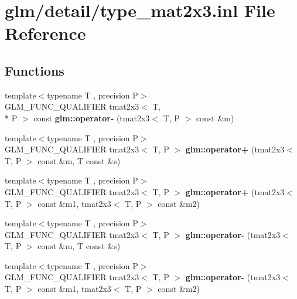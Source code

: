 \hypertarget{type__mat2x3_8inl}{\section{glm/detail/type\-\_\-mat2x3.inl File Reference}
\label{type__mat2x3_8inl}
}
\subsection*{Functions}
\begin{DoxyCompactItemize}
\item 
\hypertarget{namespaceglm_a3c270672db2f9fe9af471b877bff0453}{{\footnotesize template$<$typename T , precision P$>$ }\\G\-L\-M\-\_\-\-F\-U\-N\-C\-\_\-\-Q\-U\-A\-L\-I\-F\-I\-E\-R tmat2x3$<$ T, \\*
P $>$ const {\bfseries glm\-::operator-\/} (tmat2x3$<$ T, P $>$ const \&m)}\label{namespaceglm_a3c270672db2f9fe9af471b877bff0453}

\item 
\hypertarget{namespaceglm_a1c2757b8d487ce43f1e968d2258a9ea2}{{\footnotesize template$<$typename T , precision P$>$ }\\G\-L\-M\-\_\-\-F\-U\-N\-C\-\_\-\-Q\-U\-A\-L\-I\-F\-I\-E\-R tmat2x3$<$ T, P $>$ {\bfseries glm\-::operator+} (tmat2x3$<$ T, P $>$ const \&m, T const \&s)}\label{namespaceglm_a1c2757b8d487ce43f1e968d2258a9ea2}

\item 
\hypertarget{namespaceglm_a7578fa8147ab1357184c6043278f38e5}{{\footnotesize template$<$typename T , precision P$>$ }\\G\-L\-M\-\_\-\-F\-U\-N\-C\-\_\-\-Q\-U\-A\-L\-I\-F\-I\-E\-R tmat2x3$<$ T, P $>$ {\bfseries glm\-::operator+} (tmat2x3$<$ T, P $>$ const \&m1, tmat2x3$<$ T, P $>$ const \&m2)}\label{namespaceglm_a7578fa8147ab1357184c6043278f38e5}

\item 
\hypertarget{namespaceglm_aceff894a5f891e315294d68c9bb6f569}{{\footnotesize template$<$typename T , precision P$>$ }\\G\-L\-M\-\_\-\-F\-U\-N\-C\-\_\-\-Q\-U\-A\-L\-I\-F\-I\-E\-R tmat2x3$<$ T, P $>$ {\bfseries glm\-::operator-\/} (tmat2x3$<$ T, P $>$ const \&m, T const \&s)}\label{namespaceglm_aceff894a5f891e315294d68c9bb6f569}

\item 
\hypertarget{namespaceglm_a2a06e2f9118332e9be75b7d6e9b7810f}{{\footnotesize template$<$typename T , precision P$>$ }\\G\-L\-M\-\_\-\-F\-U\-N\-C\-\_\-\-Q\-U\-A\-L\-I\-F\-I\-E\-R tmat2x3$<$ T, P $>$ {\bfseries glm\-::operator-\/} (tmat2x3$<$ T, P $>$ const \&m1, tmat2x3$<$ T, P $>$ const \&m2)}\label{namespaceglm_a2a06e2f9118332e9be75b7d6e9b7810f}


\end{DoxyCompactItemize}
